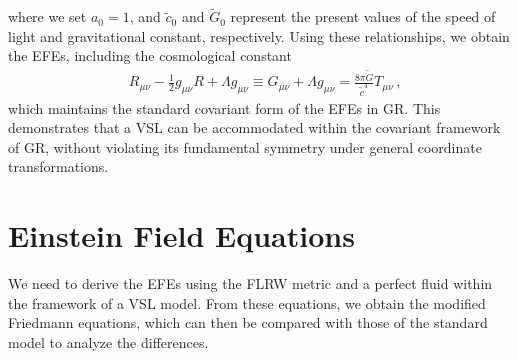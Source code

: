 \documentclass[jkps,preprint,fleqn]{revtex4} %
\newcommand{\tc}{\tilde{c}}
\newcommand{\tG}{\tilde{G}}
\begin{document}
where we set $a_0 = 1$, and $\tc_0$ and $\tG_0$ represent the present values of the speed of light and gravitational constant, respectively. Using these relationships, we obtain the EFEs, including the cosmological constant 
\begin{align} &R_{\mu\nu} - \frac{1}{2} g_{\mu\nu} R + \Lambda g_{\mu\nu} \equiv G_{\mu\nu} + \Lambda g_{\mu\nu}  = \frac{8 \pi \tG}{\tc^4} T_{\mu\nu} \label{tEFEmp} \,, \end{align} 
which maintains the standard covariant form of the EFEs in GR. This demonstrates that a VSL can be accommodated within the covariant framework of GR, without violating its fundamental symmetry under general coordinate transformations.


\section{Einstein Field Equations} \label{sec:EFEs}

We need to derive the EFEs using the FLRW metric and a perfect fluid within the framework of a VSL model. From these equations, we obtain the modified Friedmann equations, which can then be compared with those of the standard model to analyze the differences.
\end{document}
